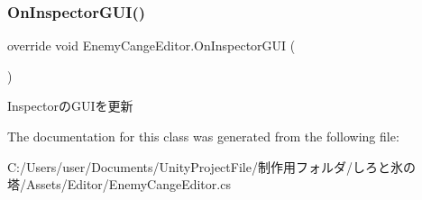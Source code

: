 \subsubsection{\texorpdfstring{On\+Inspector\+G\+U\+I()}{OnInspectorGUI()}}
{\footnotesize\ttfamily override void Enemy\+Cange\+Editor.\+On\+Inspector\+G\+UI (\begin{DoxyParamCaption}{ }\end{DoxyParamCaption})\hspace{0.3cm}{\ttfamily [inline]}}



Inspectorの\+G\+U\+Iを更新 



The documentation for this class was generated from the following file\+:\begin{DoxyCompactItemize}
\item 
C\+:/\+Users/user/\+Documents/\+Unity\+Project\+File/制作用フォルダ/しろと氷の塔/\+Assets/\+Editor/Enemy\+Cange\+Editor.\+cs\end{DoxyCompactItemize}
